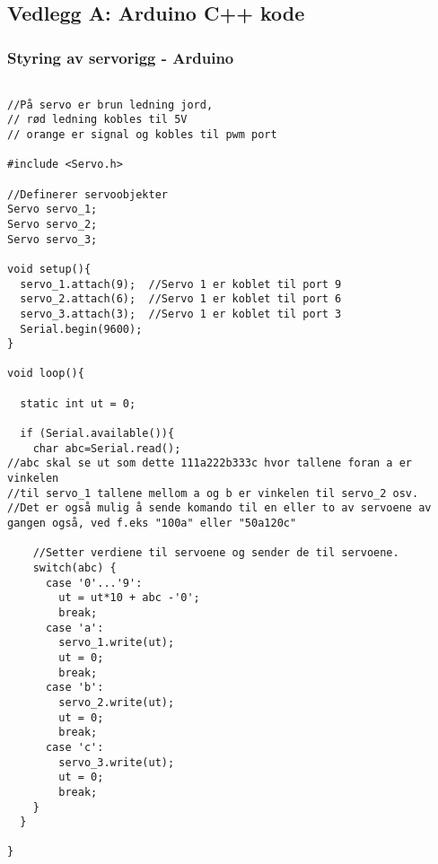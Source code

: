 \subsection{Vedlegg A: Arduino C++ kode}

\begin{frame}
\frametitle{Styring av servorigg - Arduino}
\begin{lstlisting}

//På servo er brun ledning jord, 
// rød ledning kobles til 5V 
// orange er signal og kobles til pwm port

#include <Servo.h>

//Definerer servoobjekter
Servo servo_1; 
Servo servo_2;
Servo servo_3;

void setup(){
  servo_1.attach(9);  //Servo 1 er koblet til port 9
  servo_2.attach(6);  //Servo 1 er koblet til port 6
  servo_3.attach(3);  //Servo 1 er koblet til port 3
  Serial.begin(9600);
}

void loop(){
  
  static int ut = 0;
  
  if (Serial.available()){
    char abc=Serial.read(); 
//abc skal se ut som dette 111a222b333c hvor tallene foran a er vinkelen 
//til servo_1 tallene mellom a og b er vinkelen til servo_2 osv.
//Det er også mulig å sende komando til en eller to av servoene av gangen også, ved f.eks "100a" eller "50a120c"
    
    //Setter verdiene til servoene og sender de til servoene.
    switch(abc) {
      case '0'...'9':
        ut = ut*10 + abc -'0';
        break;
      case 'a':
        servo_1.write(ut);
        ut = 0;
        break;
      case 'b':
        servo_2.write(ut);
        ut = 0;
        break;
      case 'c':
        servo_3.write(ut);
        ut = 0;
        break;
    }
  }
  
}  

\end{lstlisting}
\end{frame}
